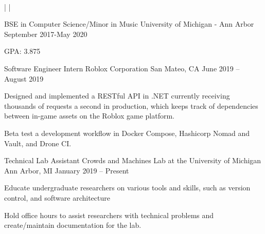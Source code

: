 \documentclass[]{awesome-cv}
\begin{document}
    
\begin{center}
	   \\

	{} | {} | {}
\end{center}
\vspace{-4mm}
\vspace{-2mm}
\cventry
	{BSE in Computer Science/Minor in Music}
	{University of Michigan - Ann Arbor}
	{}
	{September 2017-May 2020}
	{\begin{cvitems}
		\item{GPA: 3.875}
		\end{cvitems}}


\vspace{-6mm}
\vspace{-2mm}

	\cventry
	{Software Engineer Intern}
	{Roblox Corporation}
	{San Mateo, CA}
	{June 2019 – August 2019}
	{\begin{cvitems}
		\item {Designed and implemented a RESTful API in .NET currently receiving thousands of requests a second in production,
		 which keeps track of dependencies between in-game assets on the Roblox game platform.}
		\item {Beta test a development workflow in Docker Compose, Hashicorp 
		Nomad and Vault, and Drone CI.}
	\end{cvitems}}

	\vspace{-4mm}
	\cventry
	{Technical Lab Assistant}
	{Crowds and Machines Lab at the University of Michigan}
	{Ann Arbor, MI}
	{January 2019 – Present}
	{\begin{cvitems}
		\item {Educate undergraduate researchers on various tools and skills, such as version control, and software architecture}
		\item {Hold office hours to assist researchers with technical problems and create/maintain documentation for the lab.}
	\end{cvitems}}
\end{document}
